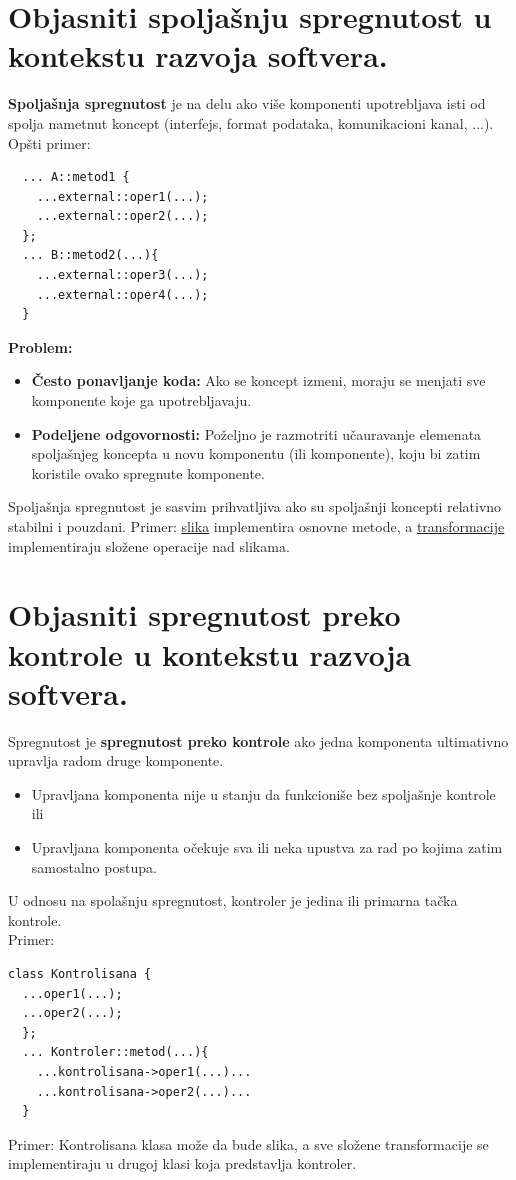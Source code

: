\documentclass[a4paper]{article}
\begin{document}
\section{Objasniti spoljašnju spregnutost u kontekstu razvoja softvera.}
  \textbf{Spoljašnja spregnutost} je na delu ako više komponenti upotrebljava isti od spolja
nametnut koncept (interfejs, format podataka, komunikacioni kanal, ...). \\
Opšti primer:
\begin{lstlisting}
  ... A::metod1 {
    ...external::oper1(...);
    ...external::oper2(...);
  };
  ... B::metod2(...){
    ...external::oper3(...);
    ...external::oper4(...);
  }\end{lstlisting}
  \textbf{Problem:}
  \begin{itemize}
    \item \textbf{Često ponavljanje koda:} Ako se koncept izmeni, moraju se menjati sve komponente
          koje ga upotrebljavaju. 
    \item \textbf{Podeljene odgovornosti:} Poželjno je razmotriti učauravanje elemenata spoljašnjeg
          koncepta u novu komponentu (ili komponente), koju bi zatim koristile ovako spregnute 
          komponente.
  \end{itemize}
  Spoljašnja spregnutost je sasvim prihvatljiva ako su spoljašnji koncepti relativno stabilni
  i pouzdani. Primer: \underline{slika} implementira osnovne metode, a \underline{transformacije}
  implementiraju složene operacije nad slikama.
  
\section{Objasniti spregnutost preko kontrole u kontekstu razvoja softvera.}
  Spregnutost je \textbf{spregnutost preko kontrole} ako jedna komponenta ultimativno upravlja
  radom druge komponente. 
  \begin{itemize}
    \item Upravljana komponenta nije u stanju da funkcioniše bez spoljašnje kontrole ili 
    \item Upravljana komponenta očekuje sva ili neka upustva za rad po kojima zatim samostalno
          postupa. 
  \end{itemize} 
  U odnosu na spolašnju spregnutost, kontroler je jedina ili primarna tačka kontrole. \\
  Primer:
\begin{lstlisting}
class Kontrolisana {
  ...oper1(...);
  ...oper2(...);
  };
  ... Kontroler::metod(...){
    ...kontrolisana->oper1(...)...
    ...kontrolisana->oper2(...)...
  }\end{lstlisting}
  Primer: Kontrolisana klasa može da bude slika, a sve složene transformacije se implementiraju
  u drugoj klasi koja predstavlja kontroler.\\
\end{document}
